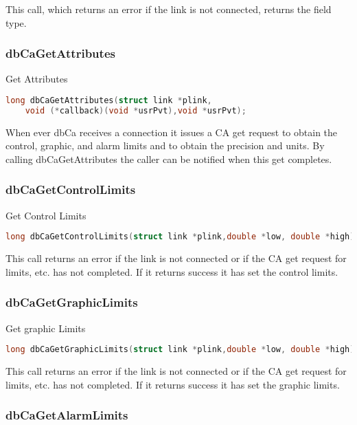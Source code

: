 This call, which returns an error if the link is not connected, returns the field type.

\subsubsection{dbCaGetAttributes}

Get Attributes

\begin{lstlisting}[language=C]
long dbCaGetAttributes(struct link *plink,
    void (*callback)(void *usrPvt),void *usrPvt);
\end{lstlisting}

When ever dbCa receives a connection it issues a CA get request to obtain the control, graphic, and alarm limits and to obtain the precision and units.
By calling dbCaGetAttributes the caller can be notified when this get completes.

\subsubsection{dbCaGetControlLimits}

Get Control Limits

\begin{lstlisting}[language=C]
long dbCaGetControlLimits(struct link *plink,double *low, double *high);
\end{lstlisting}

This call returns an error if the link is not connected or if the CA get request for limits, etc. has not completed.
If it returns success it has set the control limits.

\subsubsection{dbCaGetGraphicLimits}

Get graphic Limits

\begin{lstlisting}[language=C]
long dbCaGetGraphicLimits(struct link *plink,double *low, double *high);
\end{lstlisting}

This call returns an error if the link is not connected or if the CA get request for limits, etc. has not completed.
If it returns success it has set the graphic limits.

\subsubsection{dbCaGetAlarmLimits}


